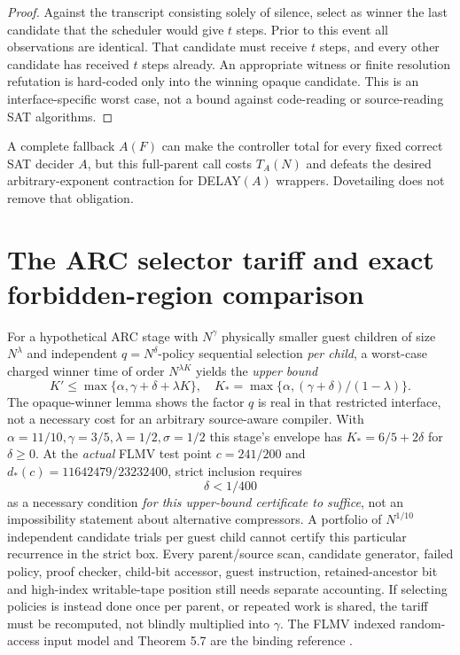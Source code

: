 \documentclass[11pt]{article}
\begin{document}
\begin{proof}
Against the transcript consisting solely of silence, select as winner the last candidate that the scheduler would give $t$ steps. Prior to this event all observations are identical. That candidate must receive $t$ steps, and every other candidate has received $t$ steps already. An appropriate witness or finite resolution refutation is hard-coded only into the winning opaque candidate. This is an interface-specific worst case, not a bound against code-reading or source-reading SAT algorithms.
\end{proof}
A complete fallback $A(F)$ can make the controller total for every fixed correct SAT decider $A$, but this full-parent call costs $T_A(N)$ and defeats the desired arbitrary-exponent contraction for DELAY$(A)$ wrappers. Dovetailing does not remove that obligation.

\section{The ARC selector tariff and exact forbidden-region comparison}
For a hypothetical ARC stage with $N^\gamma$ physically smaller guest children of size $N^\lambda$ and independent $q=N^\delta$-policy sequential selection \emph{per child}, a worst-case charged winner time of order $N^{\lambda K}$ yields the \emph{upper bound}
\[
 K'\le\max\{\alpha,\gamma+\delta+\lambda K\},
\quad K_*=\max\{\alpha,(\gamma+\delta)/(1-\lambda)\}.
\]
The opaque-winner lemma shows the factor $q$ is real in that restricted interface, not a necessary cost for an arbitrary source-aware compiler. With $\alpha=11/10,\gamma=3/5,\lambda=1/2,\sigma=1/2$ this stage's envelope has $K_*=6/5+2\delta$ for $\delta\ge0$. At the \emph{actual} FLMV test point $c=241/200$ and $d_*(c)=11642479/23232400$, strict inclusion requires
\[
 \boxed{\delta<1/400}
\]
as a necessary condition \emph{for this upper-bound certificate to suffice}, not an impossibility statement about alternative compressors. A portfolio of $N^{1/10}$ independent candidate trials per guest child cannot certify this particular recurrence in the strict box. Every parent/source scan, candidate generator, failed policy, proof checker, child-bit accessor, guest instruction, retained-ancestor bit and high-index writable-tape position still needs separate accounting. If selecting policies is instead done once per parent, or repeated work is shared, the tariff must be recomputed, not blindly multiplied into $\gamma$. The FLMV indexed random-access input model and Theorem 5.7 are the binding reference \cite{flmv}.
\end{document}
